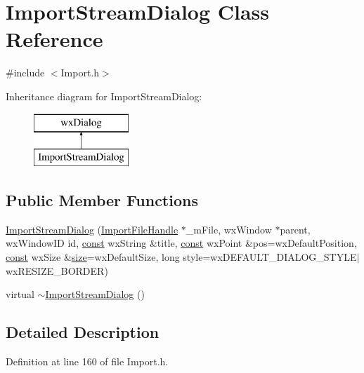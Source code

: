 \hypertarget{class_import_stream_dialog}{}\section{Import\+Stream\+Dialog Class Reference}
\label{class_import_stream_dialog}


{\ttfamily \#include $<$Import.\+h$>$}

Inheritance diagram for Import\+Stream\+Dialog\+:\begin{figure}[H]
\begin{center}
\leavevmode
\includegraphics[height=2.000000cm]{class_import_stream_dialog}
\end{center}
\end{figure}
\subsection*{Public Member Functions}
\begin{DoxyCompactItemize}
\item 
\hyperlink{class_import_stream_dialog_a4c31f2d0b1044d5476ee62b20b321621}{Import\+Stream\+Dialog} (\hyperlink{class_import_file_handle}{Import\+File\+Handle} $\ast$\+\_\+m\+File, wx\+Window $\ast$parent, wx\+Window\+ID id, \hyperlink{getopt1_8c_a2c212835823e3c54a8ab6d95c652660e}{const} wx\+String \&title, \hyperlink{getopt1_8c_a2c212835823e3c54a8ab6d95c652660e}{const} wx\+Point \&pos=wx\+Default\+Position, \hyperlink{getopt1_8c_a2c212835823e3c54a8ab6d95c652660e}{const} wx\+Size \&\hyperlink{group__lavu__mem_ga854352f53b148adc24983a58a1866d66}{size}=wx\+Default\+Size, long style=wx\+D\+E\+F\+A\+U\+L\+T\+\_\+\+D\+I\+A\+L\+O\+G\+\_\+\+S\+T\+Y\+LE$\vert$wx\+R\+E\+S\+I\+Z\+E\+\_\+\+B\+O\+R\+D\+ER)
\item 
virtual \hyperlink{class_import_stream_dialog_a865cc1e931315cc0fe84cf453d14230d}{$\sim$\+Import\+Stream\+Dialog} ()
\end{DoxyCompactItemize}


\subsection{Detailed Description}


Definition at line 160 of file Import.\+h.



